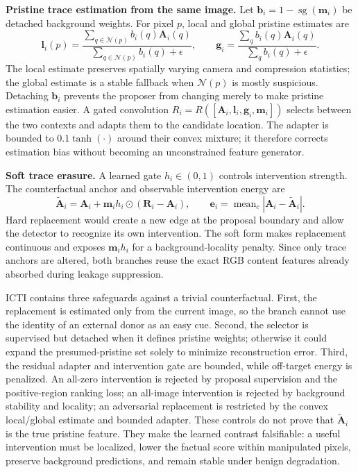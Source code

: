 \textbf{Pristine trace estimation from the same image.}
Let $\mathbf b_i=1-\operatorname{sg}(\mathbf m_i)$ be detached background weights.
For pixel $p$, local and global pristine estimates are
\begin{equation}
\mathbf l_i(p)=
\frac{\sum_{q\in\mathcal N(p)}b_i(q)\mathbf A_i(q)}
     {\sum_{q\in\mathcal N(p)}b_i(q)+\epsilon},\qquad
\mathbf g_i=
\frac{\sum_q b_i(q)\mathbf A_i(q)}{\sum_q b_i(q)+\epsilon}.
\label{eq:new_pristine}
\end{equation}
The local estimate preserves spatially varying camera and compression statistics;
the global estimate is a stable fallback when $\mathcal N(p)$ is mostly
suspicious. Detaching $\mathbf b_i$ prevents the proposer from changing merely to
make pristine estimation easier. A gated convolution
$R_i=R([\mathbf A_i,\mathbf l_i,\mathbf g_i,\mathbf m_i])$ selects between the two
contexts and adapts them to the candidate location. The adapter is bounded to
$0.1\tanh(\cdot)$ around their convex mixture; it therefore corrects estimation
bias without becoming an unconstrained feature generator.

\textbf{Soft trace erasure.}
A learned gate $h_i\in(0,1)$ controls intervention strength. The counterfactual
anchor and observable intervention energy are
\begin{equation}
\widetilde{\mathbf A}_i=\mathbf A_i+\mathbf m_i h_i\odot
(\mathbf R_i-\mathbf A_i),\qquad
\mathbf e_i=\operatorname{mean}_c|\mathbf A_i-\widetilde{\mathbf A}_i|.
\label{eq:new_intervention}
\end{equation}
Hard replacement would create a new edge at the proposal boundary and allow the
detector to recognize its own intervention. The soft form makes replacement
continuous and exposes $\mathbf m_i h_i$ for a background-locality penalty. Since
only trace anchors are altered, both branches reuse the exact RGB content
features already absorbed during leakage suppression.

ICTI contains three safeguards against a trivial counterfactual. First, the
replacement is estimated only from the current image, so the branch cannot use
the identity of an external donor as an easy cue. Second, the selector is
supervised but detached when it defines pristine weights; otherwise it could
expand the presumed-pristine set solely to minimize reconstruction error. Third,
the residual adapter and intervention gate are bounded, while off-target energy
is penalized. An all-zero intervention is rejected by proposal supervision and
the positive-region ranking loss; an all-image intervention is rejected by
background stability and locality; an adversarial replacement is restricted by
the convex local/global estimate and bounded adapter. These controls do not prove
that $\widetilde{\mathbf A}_i$ is the true pristine feature. They make the learned
contrast falsifiable: a useful intervention must be localized, lower the factual
score within manipulated pixels, preserve background predictions, and remain
stable under benign degradation.

